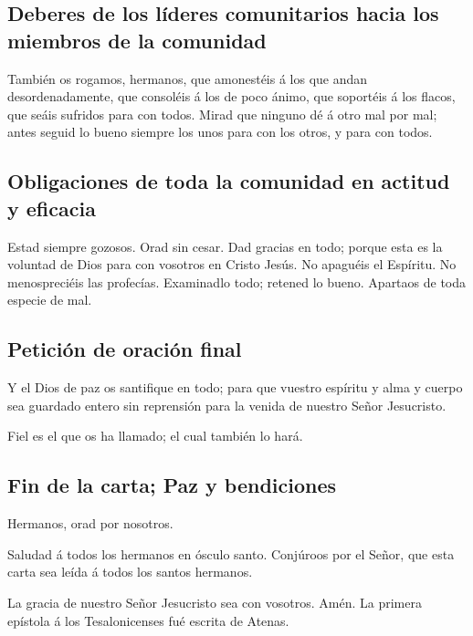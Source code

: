 \hypertarget{deberes-de-los-luxedderes-comunitarios-hacia-los-miembros-de-la-comunidad}{%
\subsection{Deberes de los líderes comunitarios hacia los miembros de la
comunidad}\label{deberes-de-los-luxedderes-comunitarios-hacia-los-miembros-de-la-comunidad}}

 También os rogamos, hermanos, que amonestéis á los que
andan desordenadamente, que consoléis á los de poco ánimo, que soportéis
á los flacos, que seáis sufridos para con todos.  Mirad que
ninguno dé á otro mal por mal; antes seguid lo bueno siempre los unos
para con los otros, y para con todos.

\hypertarget{obligaciones-de-toda-la-comunidad-en-actitud-y-eficacia}{%
\subsection{Obligaciones de toda la comunidad en actitud y
eficacia}\label{obligaciones-de-toda-la-comunidad-en-actitud-y-eficacia}}

 Estad siempre gozosos.  Orad sin cesar.
 Dad gracias en todo; porque esta es la voluntad de Dios
para con vosotros en Cristo Jesús.  No apaguéis el
Espíritu.  No menospreciéis las profecías. 
Examinadlo todo; retened lo bueno.  Apartaos de toda
especie de mal.

\hypertarget{peticiuxf3n-de-oraciuxf3n-final}{%
\subsection{Petición de oración
final}\label{peticiuxf3n-de-oraciuxf3n-final}}

 Y el Dios de paz os santifique en todo; para que vuestro
espíritu y alma y cuerpo sea guardado entero sin reprensión para la
venida de nuestro Señor Jesucristo.

 Fiel es el que os ha llamado; el cual también lo hará.

\hypertarget{fin-de-la-carta-paz-y-bendiciones}{%
\subsection{Fin de la carta; Paz y
bendiciones}\label{fin-de-la-carta-paz-y-bendiciones}}

 Hermanos, orad por nosotros.

 Saludad á todos los hermanos en ósculo santo.
 Conjúroos por el Señor, que esta carta sea leída á todos
los santos hermanos.

 La gracia de nuestro Señor Jesucristo sea con vosotros.
Amén. La primera epístola á los Tesalonicenses fué escrita de Atenas.
